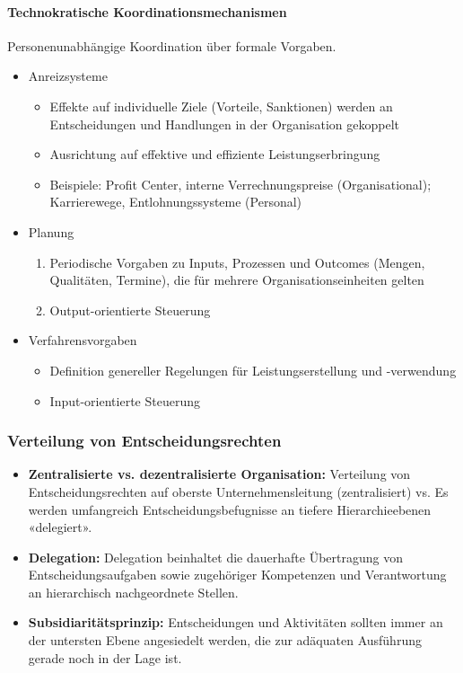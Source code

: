 \paragraph{Technokratische Koordinationsmechanismen}
Personenunabhängige Koordination über formale Vorgaben.
\begin{itemize}
	\item Anreizsysteme
	\begin{itemize}
		\item Effekte auf individuelle Ziele (Vorteile, Sanktionen) werden an Entscheidungen und Handlungen in der Organisation gekoppelt
		\item Ausrichtung auf effektive und effiziente Leistungserbringung
		\item Beispiele: Profit Center, interne Verrechnungspreise (Organisational); Karrierewege, Entlohnungssysteme (Personal)
	\end{itemize}
	\item Planung
	\begin{enumerate}
		\item Periodische Vorgaben zu Inputs, Prozessen und Outcomes (Mengen, Qualitäten, Termine), die für mehrere Organisationseinheiten gelten
		\item Output-orientierte Steuerung
	\end{enumerate}
	\item Verfahrensvorgaben
	\begin{itemize}
		\item Definition genereller Regelungen für Leistungserstellung und -verwendung
		\item Input-orientierte Steuerung
	\end{itemize}
\end{itemize}

\subsubsection{Verteilung von Entscheidungsrechten}
\begin{itemize}
	\item \textbf{Zentralisierte vs. dezentralisierte Organisation:} Verteilung von Entscheidungsrechten auf oberste Unternehmensleitung (zentralisiert) vs. Es werden umfangreich Entscheidungsbefugnisse an tiefere Hierarchieebenen «delegiert».
	\item \textbf{Delegation:} Delegation beinhaltet die dauerhafte Übertragung von Entscheidungsaufgaben sowie zugehöriger Kompetenzen und	Verantwortung an hierarchisch nachgeordnete Stellen.
	\item \textbf{Subsidiaritätsprinzip:} Entscheidungen und Aktivitäten sollten immer an der untersten Ebene angesiedelt werden, die zur adäquaten Ausführung gerade noch in der Lage ist.	
\end{itemize}

